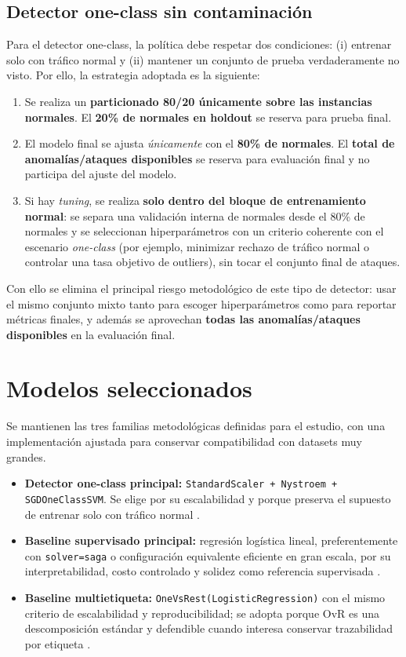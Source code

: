 \documentclass[12pt,oneside]{report}
\begin{document}
\subsection{Detector one-class sin contaminación}
Para el detector one-class, la política debe respetar dos condiciones: (i) entrenar solo con tráfico normal y (ii) mantener un conjunto de prueba verdaderamente no visto. Por ello, la estrategia adoptada es la siguiente:
\begin{enumerate}[leftmargin=*]
  \item Se realiza un \textbf{particionado 80/20 únicamente sobre las instancias normales}. El \textbf{20\% de normales en holdout} se reserva para prueba final.
  \item El modelo final se ajusta \emph{únicamente} con el \textbf{80\% de normales}. El \textbf{total de anomalías/ataques disponibles} se reserva para evaluación final y no participa del ajuste del modelo.
  \item Si hay \textit{tuning}, se realiza \textbf{solo dentro del bloque de entrenamiento normal}: se separa una validación interna de normales desde el 80\% de normales y se seleccionan hiperparámetros con un criterio coherente con el escenario \textit{one-class} (por ejemplo, minimizar rechazo de tráfico normal o controlar una tasa objetivo de outliers), sin tocar el conjunto final de ataques.
\end{enumerate}
Con ello se elimina el principal riesgo metodológico de este tipo de detector: usar el mismo conjunto mixto tanto para escoger hiperparámetros como para reportar métricas finales, y además se aprovechan \textbf{todas las anomalías/ataques disponibles} en la evaluación final.

\section{Modelos seleccionados}
Se mantienen las tres familias metodológicas definidas para el estudio, con una implementación ajustada para conservar compatibilidad con datasets muy grandes.

\begin{itemize}[leftmargin=*]
  \item \textbf{Detector one-class principal:} \texttt{StandardScaler + Nystroem + SGDOneClassSVM}. Se elige por su escalabilidad y porque preserva el supuesto de entrenar solo con tráfico normal \cite{sklearn_sgd_ocsvm,sklearn_kernel_approx}.
  \item \textbf{Baseline supervisado principal:} regresión logística lineal, preferentemente con \texttt{solver=saga} o configuración equivalente eficiente en gran escala, por su interpretabilidad, costo controlado y solidez como referencia supervisada \cite{islr_logreg,sklearn_logreg}.
  \item \textbf{Baseline multietiqueta:} \texttt{OneVsRest(LogisticRegression)} con el mismo criterio de escalabilidad y reproducibilidad; se adopta porque OvR es una descomposición estándar y defendible cuando interesa conservar trazabilidad por etiqueta \cite{tsoumakas_multilabel_overview,rifkin_ova,sklearn_logreg}.
\end{itemize}
\end{document}
